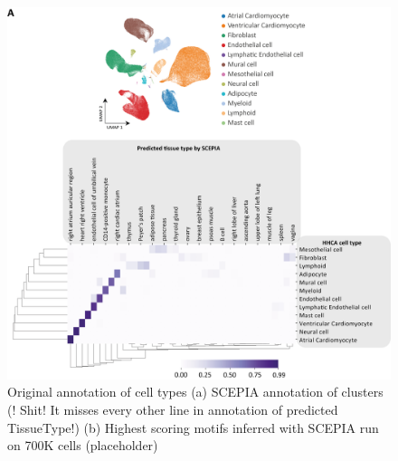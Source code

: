\begin{figure}
    \centering
    \includegraphics[width=\linewidth]{SCEPIA_Annotation_allCells_SuppFig1_v3.png}
    \caption{Original annotation of cell types (a) SCEPIA annotation of clusters (! Shit! It misses every other line in annotation of predicted TissueType!) (b) Highest scoring motifs inferred with SCEPIA run on 700K cells (placeholder) }
    \label{fig:scepia_hhca1}
\end{figure}